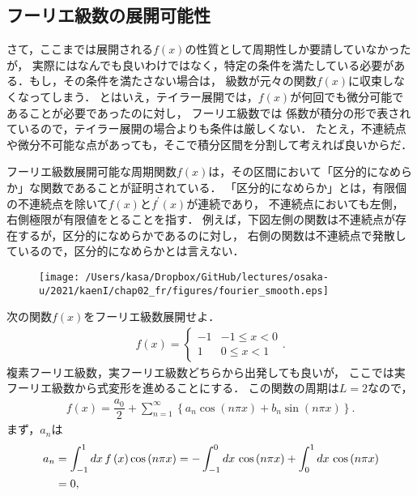 \subsection{フーリエ級数の展開可能性}
%
さて，ここまでは展開される$f(x)$の性質として周期性しか要請していなかったが，
実際にはなんでも良いわけではなく，特定の条件を満たしている必要がある．もし，その条件を満たさない場合は，
級数が元々の関数$f(x)$に収束しなくなってしまう．
とはいえ，テイラー展開では，$f\left(x\right)$が何回でも微分可能であることが必要であったのに対し，
フーリエ級数では
係数が積分の形で表されているので，テイラー展開の場合よりも条件は厳しくない．
たとえ，不連続点や微分不可能な点があっても，そこで積分区間を分割して考えれば良いからだ．

フーリエ級数展開可能な周期関数$f(x)$は，その区間において「区分的になめらか」な関数であることが証明されている．
「区分的になめらか」とは，有限個の不連続点を除いて$f(x)$と$f^{\prime}(x)$が連続であり，
不連続点においても左側，右側極限が有限値をとることを指す．
例えば，下図左側の関数は不連続点が存在するが，区分的になめらかであるのに対し，
右側の関数は不連続点で発散しているので，区分的になめらかとは言えない．
\begin{figure}[htbp]
 \texttt{[image: /Users/kasa/Dropbox/GitHub/lectures/osaka-u/2021/kaenI/chap02\_fr/figures/fourier\_smooth.eps]} 
\end{figure}
%
\newpage
%
\gl
\reidai
次の関数$f(x)$をフーリエ級数展開せよ．
\begin{align}
  f\left(x\right) =
  \begin{cases}
    -1 & -1 \leq x < 0 \\
     1 & 0  \leq x < 1 
  \end{cases}. 
\end{align}
\vspace*{.2cm}
\gl
\vspace*{.2cm}
複素フーリエ級数，実フーリエ級数どちらから出発しても良いが，
ここでは実フーリエ級数から式変形を進めることにする．
この関数の周期は$L=2$なので，
\begin{align}
 f\left(x\right) = \dfrac{a_0}{2} 
                   + \sum_{n=1}^{\infty}\left\{a_n \cos\left(n\pi x\right)
                                             +b_n \sin\left(n\pi x\right)\right\}.
\end{align}
まず，$a_n$は
\begin{align}
  a_n &= \int_{-1}^{1}dx\,f\left(x\right)\cos\left(n\pi x\right) 
       = -\int_{-1}^{0}dx\, \cos\left(n\pi x\right) + \int_{0}^{1}dx\,\cos\left(n\pi x\right) \notag \\
      &= 0,
\end{align}
